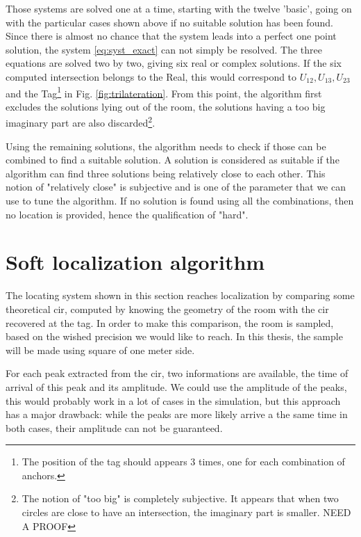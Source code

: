 Those systems are solved one at a time, starting with the twelve 'basic', going on with the particular cases shown above if no suitable solution has been found. Since there is almost no chance that the system leads into a perfect one point solution, the system \ref{eq:syst_exact} can not simply be resolved. The three equations are solved two by two, giving six real or complex solutions. If the six computed intersection belongs to the Real, this would correspond to $U_{12}, U_{13}, U_{23}$ and the Tag\footnote{The position of the tag should appears 3 times, one for each combination of anchors.} in Fig. \ref{fig:trilateration}. From this point, the algorithm first excludes the solutions lying out of the room, the solutions having a too big imaginary part are also discarded\footnote{The notion of "too big" is completely subjective. It appears that when two circles are close to have an intersection, the imaginary part is smaller. \color{red} NEED A PROOF \color{black}}. 
\vspace{2mm}

Using the remaining solutions, the algorithm needs to check if those can be combined to find a suitable solution. A solution is considered as suitable if the algorithm can find three solutions being relatively close to each other. This notion of "relatively close" is subjective and is one of the parameter that we can use to tune the algorithm. If no solution is found using all the combinations, then no location is provided, hence the qualification of "hard".
\vspace{2mm}

\section{Soft localization algorithm}
\label{soft_loc}

The locating system shown in this section reaches localization by comparing some theoretical \gls{cir}, computed by knowing the geometry of the room with the \gls{cir} recovered at the tag. In order to make this comparison, the room is sampled, based on the wished precision we would like to reach. In this thesis, the sample will be made using square of one meter side.
\vspace{2mm}

For each peak extracted from the \gls{cir}, two informations are available, the time of arrival of this peak and its amplitude. We could use the amplitude of the peaks, this would probably work in a lot of cases in the simulation, but this approach has a major drawback: while the peaks are more likely arrive a the same time in both cases, their amplitude can not be guaranteed.
\vspace{2mm}

